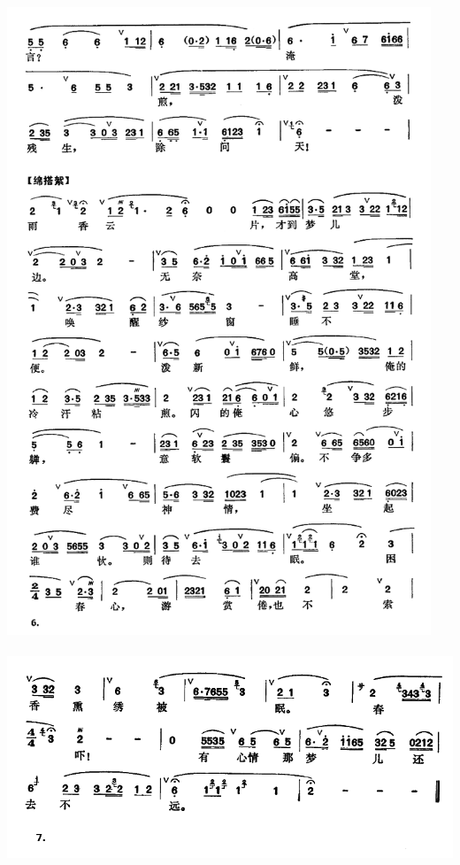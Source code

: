 \documentclass[cn,pad,twocol]{elegantbook}
\begin{document}
\paragraph*{\includegraphics[width=0.95\textwidth]{mudanting/2020-牡丹亭-游园惊梦6}}
\paragraph*{\includegraphics[width=\textwidth]{mudanting/2020-牡丹亭-游园惊梦7}}
\end{document}

